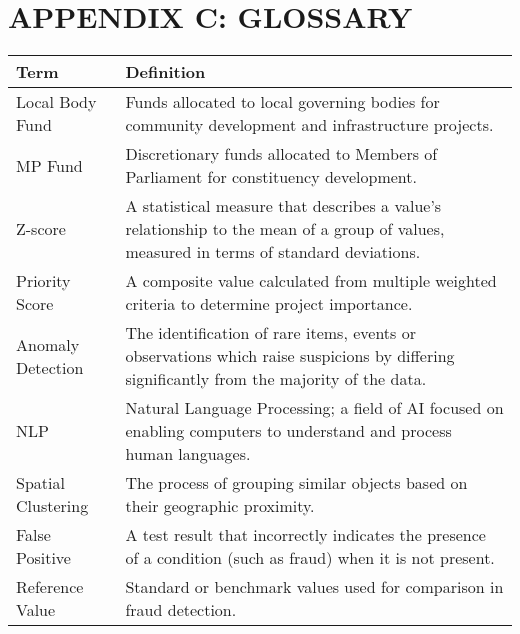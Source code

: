\documentclass[12pt,a4paper]{report}
\begin{document}
\chapter{APPENDIX C: GLOSSARY}

\begin{center}
\begin{tabular}{>{\raggedright\arraybackslash}p{4cm} >{\raggedright\arraybackslash}p{11cm}}
\textbf{Term} & \textbf{Definition} \\
\hline
Local Body Fund & Funds allocated to local governing bodies for community development and infrastructure projects. \\
MP Fund & Discretionary funds allocated to Members of Parliament for constituency development. \\
Z-score & A statistical measure that describes a value's relationship to the mean of a group of values, measured in terms of standard deviations. \\
Priority Score & A composite value calculated from multiple weighted criteria to determine project importance. \\
Anomaly Detection & The identification of rare items, events or observations which raise suspicions by differing significantly from the majority of the data. \\
NLP & Natural Language Processing; a field of AI focused on enabling computers to understand and process human languages. \\
Spatial Clustering & The process of grouping similar objects based on their geographic proximity. \\
False Positive & A test result that incorrectly indicates the presence of a condition (such as fraud) when it is not present. \\
Reference Value & Standard or benchmark values used for comparison in fraud detection. \\
\end{tabular}
\end{center}
\end{document}
